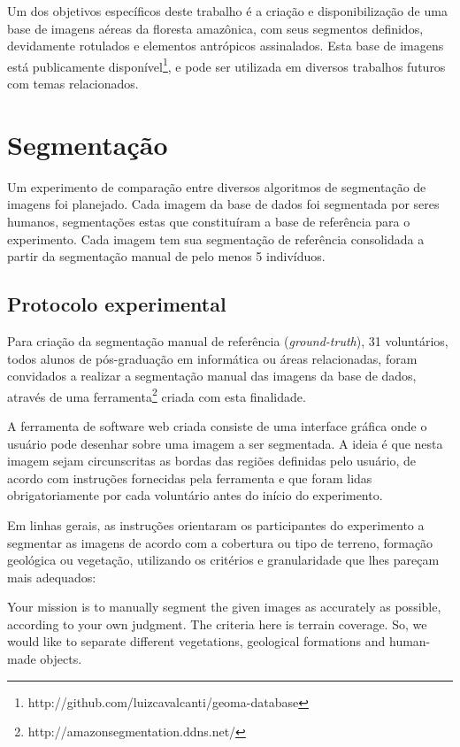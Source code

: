 Um dos objetivos específicos deste trabalho é a criação e disponibilização de uma base de imagens aéreas da floresta amazônica, com seus segmentos definidos, devidamente rotulados e elementos antrópicos assinalados. Esta base de imagens está publicamente disponível\footnote{http://github.com/luizcavalcanti/geoma-database}, e pode ser utilizada em diversos trabalhos futuros com temas relacionados.

\section{Segmentação}\label{sec:expSegmentacao}

Um experimento de comparação entre diversos algoritmos de segmentação de imagens foi planejado. Cada imagem da base de dados foi segmentada por seres humanos, segmentações estas que constituíram a base de referência para o experimento. Cada imagem tem sua segmentação de referência consolidada a partir da segmentação manual de pelo menos 5 indivíduos.

\subsection{Protocolo experimental}

Para criação da segmentação manual de referência (\textit{ground-truth}), 31 voluntários, todos alunos de pós-graduação em informática ou áreas relacionadas, foram convidados a realizar a segmentação manual das imagens da base de dados, através de uma ferramenta\footnote{http://amazonsegmentation.ddns.net/} criada com esta finalidade.

A ferramenta de software web criada consiste de uma interface gráfica onde o usuário pode desenhar sobre uma imagem a ser segmentada. A ideia é que nesta imagem sejam circunscritas as bordas das regiões definidas pelo usuário, de acordo com instruções fornecidas pela ferramenta e que foram lidas obrigatoriamente por cada voluntário antes do início do experimento.

Em linhas gerais, as instruções orientaram os participantes do experimento a segmentar as imagens de acordo com a cobertura ou tipo de terreno, formação geológica ou vegetação, utilizando os critérios e granularidade que lhes pareçam mais adequados:

\begin{citacao}[english]
Your mission is to manually segment the given images as accurately as possible, according to your own judgment. The criteria here is terrain coverage. So, we would like to separate different vegetations, geological formations and human-made objects. \cite{amazonsegmentation}
\end{citacao}

